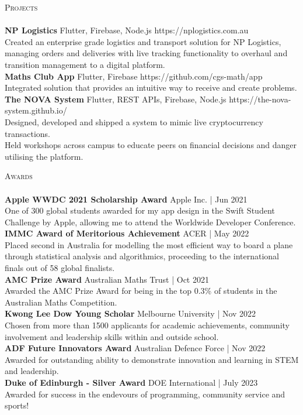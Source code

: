 \documentclass[a4paper]{article}
\newcommand{\lineunder} {
    \vspace*{-8pt} \\
    \hspace*{-18pt} \hrulefill \\
}
\newcommand{\header} [1] {
    {\hspace*{-18pt}\vspace*{6pt} \textsc{#1}}
    \vspace*{-6pt} \lineunder
}
\begin{document}
\header{Projects}
{\textbf{NP Logistics}} {\textsl{\hfill} Flutter, Firebase, Node.js}  https://nplogistics.com.au\\
Created an enterprise grade logistics and transport solution for NP Logistics, managing orders and deliveries with live tracking functionality to overhaul and transition management to a digital platform.\\
\vspace*{2mm}
{\textbf{Maths Club App}} {\textsl{\hfill} Flutter, Firebase}  https://github.com/cgs-math/app\\
Integrated solution that provides an intuitive way to receive and create problems.\\
\vspace*{2mm}
{\textbf{The NOVA System}} {\textsl{\hfill} Flutter, REST APIs, Firebase, Node.js}  https://the-nova-system.github.io/\\
Designed, developed and shipped a system to mimic live cryptocurrency transactions.\\
Held workshops across campus to educate peers on financial decisions and danger utilising the platform.\\
\vspace*{2mm}

\header{Awards}
\textbf{Apple WWDC 2021 Scholarship Award} \hfill Apple Inc. | Jun 2021\\
One of 300 global students awarded for my app design in the Swift Student Challenge by Apple, allowing me to attend the Worldwide Developer Conference.\\
\vspace*{2mm}
\textbf{IMMC Award of Meritorious Achievement} \hfill ACER | May 2022\\
Placed second in Australia for modelling the most efficient way to board a plane through statistical analysis and algorithmics, proceeding to the international finals out of 58 global finalists.\\
\vspace*{2mm}
\textbf{AMC Prize Award} \hfill Australian Maths Trust | Oct 2021\\
Awarded the AMC Prize Award for being in the top 0.3\% of students in the Australian Maths Competition.\\
\vspace*{2mm}
\textbf{Kwong Lee Dow Young Scholar} \hfill Melbourne University | Nov 2022\\
Chosen from more than 1500 applicants for academic achievements, community involvement and leadership skills within and outside school.\\
\vspace*{2mm}
\textbf{ADF Future Innovators Award} \hfill Australian Defence Force | Nov 2022\\
Awarded for outstanding ability to demonstrate innovation and learning in STEM and leadership.\\
\textbf{Duke of Edinburgh - Silver Award} \hfill DOE International | July 2023\\
Awarded for success in the endevours of programming, community service and sports!\\
\vspace*{2mm}
\end{document}
